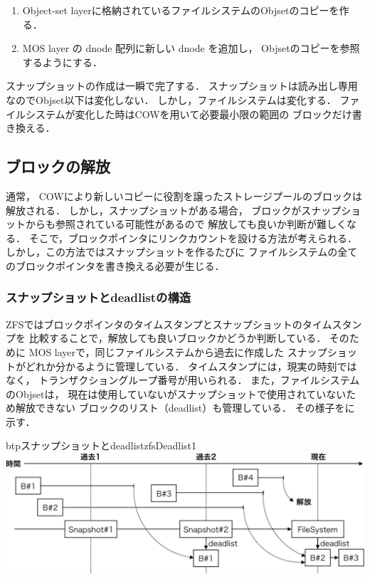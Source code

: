\begin{enumerate}
\item Object-set layerに格納されているファイルシステムのObjsetのコピーを作る．
\item MOS layer の dnode 配列に新しい dnode を追加し，
  Objsetのコピーを参照するようにする．
\end{enumerate}

スナップショットの作成は一瞬で完了する．
スナップショットは読み出し専用なのでObjset以下は変化しない．
しかし，ファイルシステムは変化する．
ファイルシステムが変化した時はCOWを用いて必要最小限の範囲の
ブロックだけ書き換える．

\subsection{ブロックの解放}
通常，
COWにより新しいコピーに役割を譲ったストレージプールのブロックは解放される．
しかし，スナップショットがある場合，
ブロックがスナップショットからも参照されている可能性があるので
解放しても良いか判断が難しくなる．
そこで，ブロックポインタにリンクカウントを設ける方法が考えられる．
しかし，この方法ではスナップショットを作るたびに
ファイルシステムの全てのブロックポインタを書き換える必要が生じる．

\subsubsection{スナップショットとdeadlistの構造}
ZFSではブロックポインタのタイムスタンプとスナップショットのタイムスタンプを
比較することで，解放しても良いブロックかどうか判断している．
そのために MOS layerで，同じファイルシステムから過去に作成した
スナップショットがどれか分かるように管理している．
タイムスタンプには，現実の時刻ではなく，
トランザクショングループ番号が用いられる．
また，ファイルシステムのObjsetは，
現在は使用していないがスナップショットで使用されていないため解放できない
ブロックのリスト（deadlist）も管理している．
その様子をに示す．

\begin{myfig}{btp}{スナップショットとdeadlist}{zfsDeadlist1}
  \centering\includegraphics[scale=0.7]{Fig/zfsDeadlist1-crop.pdf}
\end{myfig}

